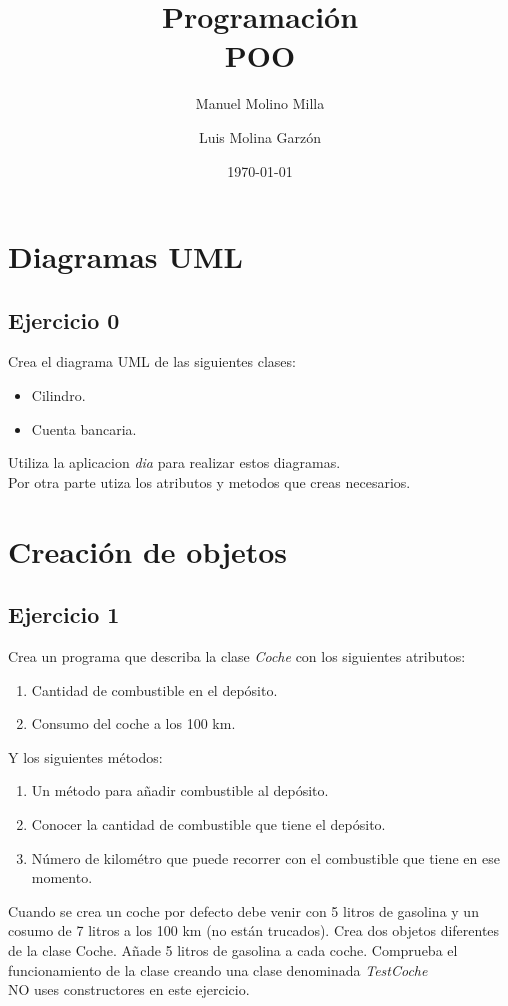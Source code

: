 \documentclass[4paper]{article}
\author{Manuel Molino Milla \and Luis Molina Garzón}
\title{\textbf{Programación}
\\POO}
\date{\today}
\begin{document}
\maketitle \tableofcontents %


\section{Diagramas UML}
\subsection{Ejercicio 0}
Crea el diagrama UML de las siguientes clases:
\begin{itemize}
\item Cilindro.
\item Cuenta bancaria.
\end{itemize}
Utiliza la aplicacion \emph{dia} para realizar estos diagramas.\\
Por otra parte utiza los atributos y metodos que creas necesarios.

\section{Creación de objetos}
\subsection{Ejercicio 1}
Crea un programa que describa la clase \emph{Coche} con los siguientes atributos:
\begin{enumerate}
\item Cantidad de combustible en el depósito.
\item Consumo del coche a los 100 km.
\end{enumerate}
Y los siguientes métodos:
\begin{enumerate}
\item Un método para añadir combustible al depósito.
\item Conocer la cantidad de combustible que tiene el depósito.
\item Número de kilométro que puede recorrer con el combustible que tiene en ese momento.
\end{enumerate}
Cuando se crea un coche por defecto debe venir con 5 litros de gasolina y un cosumo de 7 litros a los 100 km (no están trucados). Crea dos objetos diferentes de la clase Coche. Añade 5 litros de gasolina a cada coche. Comprueba el funcionamiento de la clase creando una clase denominada \emph{TestCoche}\\
NO uses constructores en este ejercicio.
\end{document}
